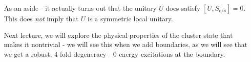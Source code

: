 As an aside - it actually turns out that the unitary $U$ does satisfy $[U, S_{e/o}] = 0$. This does \emph{not} imply that $U$ is a symmetric local unitary.

Next lecture, we will explore the physical properties of the cluster state that makes it nontrivial - we will see this when we add boundaries, as we will see that we get a robust, 4-fold degeneracy - 0 energy excitations at the boundary.